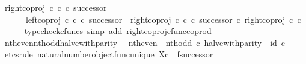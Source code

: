 \begin{isabellebody}
\ {\isachardoublequoteopen}right{\isacharunderscore}{\kern0pt}coproj\ {\isasymnat}\isactrlsub c\ {\isasymnat}\isactrlsub c\ {\isasymcirc}\isactrlsub c\ successor\ {\isacharequal}{\kern0pt}\isanewline
\ \ \ \ \ \ {\isacharparenleft}{\kern0pt}left{\isacharunderscore}{\kern0pt}coproj\ {\isasymnat}\isactrlsub c\ {\isasymnat}\isactrlsub c\ {\isasymcirc}\isactrlsub c\ successor{\isacharparenright}{\kern0pt}\ {\isasymamalg}\ {\isacharparenleft}{\kern0pt}right{\isacharunderscore}{\kern0pt}coproj\ {\isasymnat}\isactrlsub c\ {\isasymnat}\isactrlsub c\ {\isasymcirc}\isactrlsub c\ successor{\isacharparenright}{\kern0pt}\ {\isasymcirc}\isactrlsub c\ right{\isacharunderscore}{\kern0pt}coproj\ {\isasymnat}\isactrlsub c\ {\isasymnat}\isactrlsub c{\isachardoublequoteclose}\isanewline
\ \ \ \ \isamarkupfalse%
\ {\isacharparenleft}{\kern0pt}typecheck{\isacharunderscore}{\kern0pt}cfuncs{\isacharcomma}{\kern0pt}\ simp\ add{\isacharcolon}{\kern0pt}\ right{\isacharunderscore}{\kern0pt}coproj{\isacharunderscore}{\kern0pt}cfunc{\isacharunderscore}{\kern0pt}coprod{\isacharparenright}{\kern0pt}\isanewline
{}\isamarkupfalse%
%
\endisatagproof
{\isafoldproof}%
%
\isadelimproof
\isanewline
%
\endisadelimproof
\isanewline
{}\isamarkupfalse%
\ nth{\isacharunderscore}{\kern0pt}even{\isacharunderscore}{\kern0pt}nth{\isacharunderscore}{\kern0pt}odd{\isacharunderscore}{\kern0pt}halve{\isacharunderscore}{\kern0pt}with{\isacharunderscore}{\kern0pt}parity{\isacharcolon}{\kern0pt}\isanewline
\ \ {\isachardoublequoteopen}{\isacharparenleft}{\kern0pt}nth{\isacharunderscore}{\kern0pt}even\ {\isasymamalg}\ nth{\isacharunderscore}{\kern0pt}odd{\isacharparenright}{\kern0pt}\ {\isasymcirc}\isactrlsub c\ halve{\isacharunderscore}{\kern0pt}with{\isacharunderscore}{\kern0pt}parity\ {\isacharequal}{\kern0pt}\ id\ {\isasymnat}\isactrlsub c{\isachardoublequoteclose}\isanewline
%
\isadelimproof
%
\endisadelimproof
%
\isatagproof
{}\isamarkupfalse%
\ {\isacharparenleft}{\kern0pt}etcs{\isacharunderscore}{\kern0pt}rule\ natural{\isacharunderscore}{\kern0pt}number{\isacharunderscore}{\kern0pt}object{\isacharunderscore}{\kern0pt}func{\isacharunderscore}{\kern0pt}unique{\isacharbrackleft}{\kern0pt}\ X{\isacharequal}{\kern0pt}{\isachardoublequoteopen}{\isasymnat}\isactrlsub c{\isachardoublequoteclose}{\isacharcomma}{\kern0pt}\ \ f{\isacharequal}{\kern0pt}{\isachardoublequoteopen}successor{\isachardoublequoteclose}{\isacharbrackright}{\kern0pt}{\isacharparenright}{\kern0pt}\isanewline
\ \ \isamarkupfalse%

\end{isabellebody}
